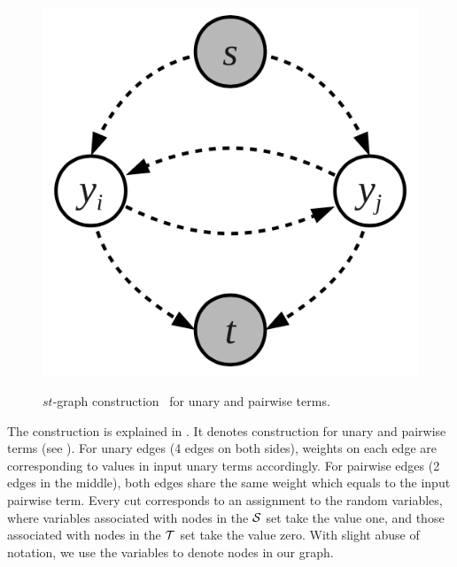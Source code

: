 \begin{figure}[t]
  \centering
    \includegraphics[width=0.5\columnwidth]{Methodology/figures/unary_pairwise.png}\\
  \caption{\label{fig:stmincut} $st$-graph
    construction~\cite{gouldlearning} for unary and pairwise
    terms.}
\end{figure}

The construction is explained in . It
denotes construction for unary and pairwise terms (see
\cite{Kolmogorov:PAMI04}). For unary edges (4 edges on both
sides), weights on each edge are corresponding to values in input
unary terms accordingly. For pairwise edges (2 edges in the
middle), both edges share the same weight which equals to the
input pairwise term. Every cut corresponds to an assignment to
the random variables, where variables associated with nodes in
the ${\cal S}$ set take the value one, and those associated with
nodes in the $\T$ set take the value zero. With slight abuse of
notation, we use the variables to denote nodes in our graph.




